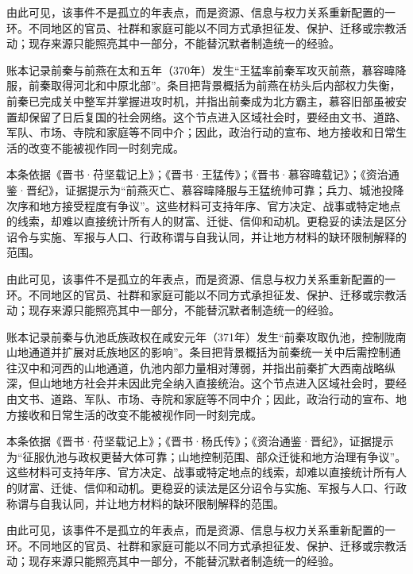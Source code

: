 由此可见，该事件不是孤立的年表点，而是资源、信息与权力关系重新配置的一环。不同地区的官员、社群和家庭可能以不同方式承担征发、保护、迁移或宗教活动；现存来源只能照亮其中一部分，不能替沉默者制造统一的经验。

账本记录前秦与前燕在太和五年（370年）发生“王猛率前秦军攻灭前燕，慕容暐降服，前秦取得河北和中原北部”。条目把背景概括为前燕在枋头后内部权力失衡，前秦已完成关中整军并掌握进攻时机，并指出前秦成为北方霸主，慕容旧部虽被安置却保留了日后复国的社会网络。这个节点进入区域社会时，要经由文书、道路、军队、市场、寺院和家庭等不同中介；因此，政治行动的宣布、地方接收和日常生活的改变不能被视作同一时刻完成。

本条依据《晋书·苻坚载记上》；《晋书·王猛传》；《晋书·慕容暐载记》；《资治通鉴·晋纪》，证据提示为“前燕灭亡、慕容暐降服与王猛统帅可靠；兵力、城池投降次序和地方接受程度有争议”。这些材料可支持年序、官方决定、战事或特定地点的线索，却难以直接统计所有人的财富、迁徙、信仰和动机。更稳妥的读法是区分诏令与实施、军报与人口、行政称谓与自我认同，并让地方材料的缺环限制解释的范围。

由此可见，该事件不是孤立的年表点，而是资源、信息与权力关系重新配置的一环。不同地区的官员、社群和家庭可能以不同方式承担征发、保护、迁移或宗教活动；现存来源只能照亮其中一部分，不能替沉默者制造统一的经验。

账本记录前秦与仇池氐族政权在咸安元年（371年）发生“前秦攻取仇池，控制陇南山地通道并扩展对氐族地区的影响”。条目把背景概括为前秦统一关中后需控制通往汉中和河西的山地通道，仇池内部力量相对薄弱，并指出前秦扩大西南战略纵深，但山地地方社会并未因此完全纳入直接统治。这个节点进入区域社会时，要经由文书、道路、军队、市场、寺院和家庭等不同中介；因此，政治行动的宣布、地方接收和日常生活的改变不能被视作同一时刻完成。

本条依据《晋书·苻坚载记上》；《晋书·杨氏传》；《资治通鉴·晋纪》，证据提示为“征服仇池与政权更替大体可靠；山地控制范围、部众迁徙和地方治理有争议”。这些材料可支持年序、官方决定、战事或特定地点的线索，却难以直接统计所有人的财富、迁徙、信仰和动机。更稳妥的读法是区分诏令与实施、军报与人口、行政称谓与自我认同，并让地方材料的缺环限制解释的范围。

由此可见，该事件不是孤立的年表点，而是资源、信息与权力关系重新配置的一环。不同地区的官员、社群和家庭可能以不同方式承担征发、保护、迁移或宗教活动；现存来源只能照亮其中一部分，不能替沉默者制造统一的经验。

